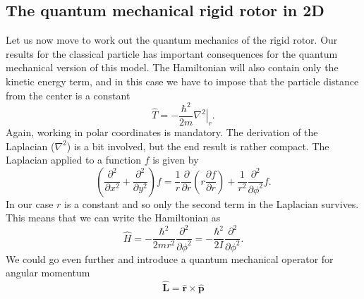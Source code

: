 \documentclass[../Main/chem331-notes.tex]{subfiles}
\begin{document}
\subsection{The quantum mechanical rigid rotor in 2D}
Let us now move to work out the quantum mechanics of the rigid rotor.
Our results for the classical particle has important consequences for the quantum mechanical version of this model.
The Hamiltonian will also contain only the kinetic energy term, and in this case we have to impose that the particle distance from the center is a constant
\begin{equation}
\hat{T} = -\frac{\hbar^2}{2 m} \left. \nabla^2 \right|_{r}.
\end{equation}
Again, working in polar coordinates is mandatory.
The derivation of the Laplacian ($\nabla^2$) is a bit involved, but the end result is rather compact.
The Laplacian applied to a function $f$ is given by
\begin{equation}
\left(\frac{\partial^2}{\partial x^2} + \frac{\partial^2}{\partial y^2} \right) f
= \frac{1}{r} \frac{\partial}{\partial r} \left( r \frac{\partial f}{\partial r} \right)
+ \frac{1}{r^2} \frac{\partial^2}{\partial \phi^2} f.
\end{equation}
In our case $r$ is a constant and so only the second term in the Laplacian survives.
This means that we can write the Hamiltonian as
\begin{equation}
\label{eq:rigidrotor:hamiltonian_ring}
\hat{H} = -\frac{\hbar^2}{2 m r^2} \frac{\partial^2}{\partial \phi^2}
= -\frac{\hbar^2}{2 I} \frac{\partial^2}{\partial \phi^2}.
\end{equation}
We could go even further and introduce a quantum mechanical operator for angular momentum
\begin{equation}
\hat{\mathbf{L}} = \hat{\mathbf{r}} \times \hat{\mathbf{p}}
\end{equation}
\end{document}

